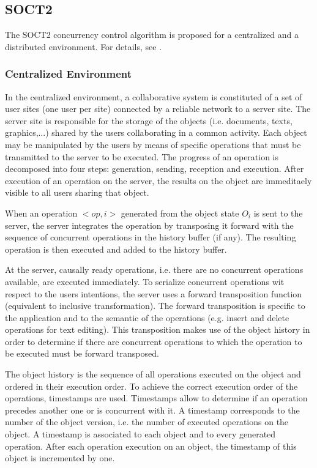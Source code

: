 \subsection{SOCT2}
\label{algo:soct2}

The SOCT2 concurrency control algorithm is proposed for a centralized and a distributed environment. For details, see \cite{suleiman97} \cite{suleiman98}.

\subsubsection{Centralized Environment}
In the centralized environment, a collaborative system is constituted of a set of user sites (one user per site) connected by a reliable network to a server site. The server site is responsible for the storage of the objects (i.e. documents, texts, graphics,...) shared by the users collaborating in a common activity. Each object may be manipulated by the users by means of specific operations that must be transmitted to the server to be executed. The progress of an operation is decomposed into four steps: generation, sending, reception and execution. After execution of an operation on the server, the results on the object are immeditaely visible to all users sharing that object.

When an operation $<op,i>$ generated from the object state $O_{i}$ is sent to the server, the server integrates the operation by transposing it forward with the sequence of concurrent operations in the history buffer (if any). The resulting operation is then executed and added to the history buffer.

At the server, causally ready operations, i.e. there are no concurrent operations available, are executed immediately. To serialize concurrent operations wit respect to the users intentions, the server uses a forward transposition function (equivalent to inclusive transformation). The forward transposition is specific to the application and to the semantic of the operations (e.g. insert and delete operations for text editing). This transposition makes use of the object history in order to determine if there are concurrent operations to which the operation to be executed must be forward transposed.

The object history is the sequence of all operations executed on the object and ordered in their execution order. To achieve the correct execution order of the operations, timestamps are used. Timestamps allow to determine if an operation precedes another one or is concurrent with it. A timestamp corresponds to the number of the object version, i.e. the number of executed operations on the object. A timestamp is associated to each object and to every generated operation. After each operation execution on an object, the timestamp of this object is incremented by one.  

